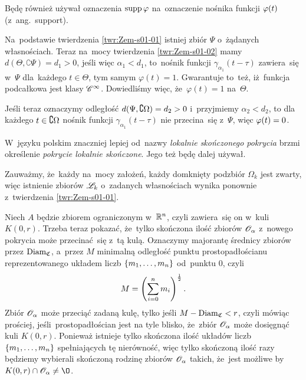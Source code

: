 \documentclass[a4paper,11pt]{article}
\begin{document}
Będę również używał oznaczenia $\mathrm{supp}\, \varphi$ na~oznaczenie nośnika
funkcji $\varphi( t )$ (z~ang.~support).

\vspace{\spaceFour}


\start {}  Na~podstawie
twierdzenia \ref{twr:Zem-s01-01} istniej zbiór $\Psi$ o~żądanych
własnościach. Teraz na~mocy twierdzenia \eqref{twr:Zem-s01-02} mamy
$d( \Theta, \complement \Psi ) = d_{ 1 } > 0$, jeśli więc
$\alpha_{ 1 } < d_{ 1 }$, to~nośnik funkcji
$\gamma_{ \alpha_{ 1 } }( t - \tau )$ zawiera~się w~$\Psi$ dla~każdego
$t \in \Theta$, tym samym $\varphi( t ) = 1$. Gwarantuje to~też,
iż~funkcja podcałkowa jest klasy $\mathcal{C}^{ \infty }$. Dowiedliśmy więc,
że~$\varphi( t ) = 1$ na~$\Theta$.

Jeśli teraz oznaczymy odległość $d( \Psi, \complement \Omega ) = d_{ 2 } > 0$
i~przyjmiemy $\alpha_{ 2 } < d_{ 2 }$, to dla każdego $t \in \complement \Omega$
nośnik funkcji $\gamma_{ \alpha_{ 1 } }( t - \tau )$ nie przecina~się
z~$\Psi$, więc $\varphi( t ) = 0$.

\vspace{\spaceFour}


\start {} W~języku polskim znaczniej lepiej od~nazwy
\emph{lokalnie skończonego pokrycia} brzmi określenie \emph{pokrycie
  lokalnie skończone}. Jego też będę dalej używał.

\vspace{\spaceFour}


\start {}  Zauważmy, że~każdy na~mocy
założeń, każdy domknięty podzbiór $\Omega_{ k }$ jest zwarty, więc
istnienie zbiorów $\mathcal{L}_{ k }$ o~zadanych własnościach wynika ponownie
z~twierdzenia \eqref{twr:Zem-s01-01}.

\vspace{\spaceFour}


\start {}  Niech $A$ będzie zbiorem
ograniczonym w~$\mathbb{ R }^{ n }$, czyli zawiera~się on w~kuli $K( 0, r )$. Trzeba
teraz pokazać, że~tylko skończona ilość zbiorów $\mathcal{O}_{ \alpha }$ z~nowego
pokrycia może przecinać~się z~tą kulą. Oznaczymy majorantę średnicy
zbiorów przez $\mathrm{Diam}_{ \mathfrak{ C } }$, a~przez $M$ minimalną
odległość punktu prostopadłościanu reprezentowanego układem liczb
$\{ m_{ 1 }, \ldots, m_{ n } \}$ od~punktu $0$, czyli
\begin{equation}
  \label{eq:Zem-s01-06}
  M = \left( \sum_{ i = 0 }^{ n } m_{ i } \right)^{ \frac{ 1 }{ 2 } }.
\end{equation}
Zbiór $\mathcal{O}_{ \alpha }$ może przeciąć zadaną kulę, tylko jeśli
$M - \mathrm{Diam}_{ \mathfrak{C} } < r$, czyli mówiąc prościej,
jeśli~prostopadłościan jest na tyle blisko, że~zbiór $\mathcal{O}_{ \alpha }$
może dosięgnąć kuli $K( 0, r )$. Ponieważ istnieje tylko skończona
ilość układów liczb $\{ m_{ 1 }, \ldots, m_{ n } \}$ spełniających tę
nierówność, więc tylko skończoną ilość razy będziemy wybierali
skończoną rodzinę zbiorów $\mathcal{O}_{ \alpha }$ takich, że~jest możliwe
by~$K( 0, r ) \cap \Oc_{ \alpha } \neq \O$.
\end{document}
